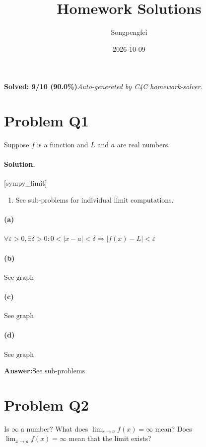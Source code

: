 \documentclass[11pt,a4paper]{article}
\title{Homework Solutions}
\author{Songpengfei}
\date{2026-10-09}
\newcommand{\solvertag}[1]{{\footnotesize\color{gray}\textsf{[#1]}}}
\begin{document}
\maketitle

\noindent\textbf{Solved: 9/10 (90.0\%)}\quad\textit{Auto-generated by C4C homework-solver.}

\section*{Problem Q1}
Suppose $f$ is a function and $L$ and $a$ are real numbers.

\paragraph{Solution.} \solvertag{sympy\_limit} 

\begin{enumerate}[leftmargin=*]
  \item See sub-problems for individual limit computations.
\end{enumerate}

\paragraph{(a)} $\forall \varepsilon > 0, \exists \delta > 0: 0 < |x-a| < \delta \Rightarrow |f(x)-L| < \varepsilon$

\paragraph{(b)} $\text{See graph}$

\paragraph{(c)} $\text{See graph}$

\paragraph{(d)} $\text{See graph}$

\noindent\textbf{Answer:}\quad $\text{See sub-problems}$

\medskip

\section*{Problem Q2}
Is $\infty$ a number? What does $\lim_{x \to a} f(x) = \infty$ mean? Does $\lim_{x \to a} f(x) = \infty$ mean that the limit exists?
\end{document}
